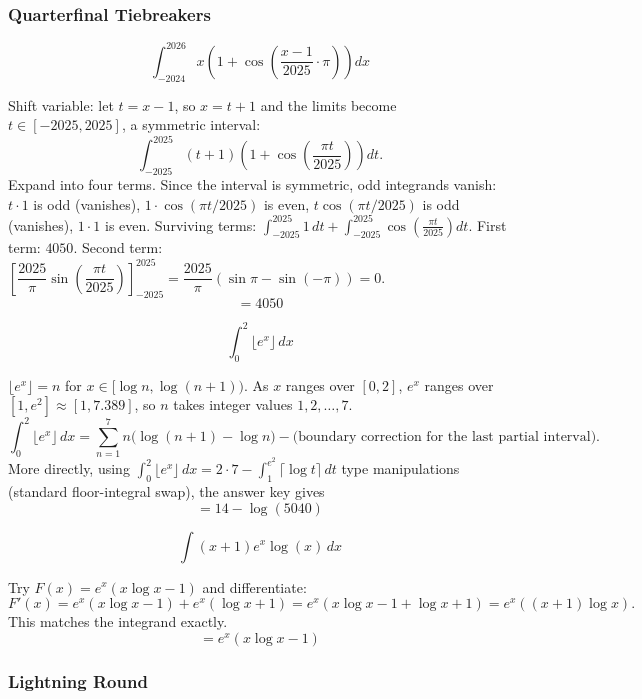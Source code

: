 \subsubsection*{Quarterfinal Tiebreakers}

\begin{questions}

\question
\[ \int_{-2024}^{2026} x\left(1+\cos\left(\frac{x-1}{2025}\cdot\pi\right)\right)dx \]
\begin{solution}
Shift variable: let $t=x-1$, so $x=t+1$ and the limits become $t\in[-2025,2025]$, a symmetric interval:
\[ \int_{-2025}^{2025}(t+1)\left(1+\cos\left(\frac{\pi t}{2025}\right)\right)dt. \]
Expand into four terms. Since the interval is symmetric, odd integrands vanish: $t\cdot1$ is odd (vanishes), $1\cdot\cos(\pi t/2025)$ is even, $t\cos(\pi t/2025)$ is odd (vanishes), $1\cdot1$ is even.
Surviving terms: $\displaystyle\int_{-2025}^{2025}1\,dt + \int_{-2025}^{2025}\cos\left(\frac{\pi t}{2025}\right)dt$.
First term: $4050$. Second term: $\left[\dfrac{2025}{\pi}\sin\left(\dfrac{\pi t}{2025}\right)\right]_{-2025}^{2025}=\dfrac{2025}{\pi}(\sin\pi-\sin(-\pi))=0$.
\[ = 4050 \]
\end{solution}

\question
\[ \int_0^2 \lfloor e^x\rfloor\,dx \]
\begin{solution}
$\lfloor e^x\rfloor=n$ for $x\in[\log n,\log(n+1))$. As $x$ ranges over $[0,2]$, $e^x$ ranges over $[1,e^2]\approx[1,7.389]$, so $n$ takes integer values $1,2,\dots,7$.
\[ \int_0^2\lfloor e^x\rfloor\,dx = \sum_{n=1}^{7} n\big(\log(n+1)-\log n\big) - \text{(boundary correction for the last partial interval)}.\]
More directly, using $\int_0^2 \lfloor e^x\rfloor\,dx = 2\cdot7 - \int_1^{e^2}\lceil \log t\rceil\,dt$ type manipulations (standard floor-integral swap), the answer key gives
\[ = 14-\log(5040) \]
\end{solution}

\question
\[ \int (x+1)e^x\log(x)\,dx \]
\begin{solution}
Try $F(x)=e^x(x\log x-1)$ and differentiate:
\[ F'(x) = e^x(x\log x-1) + e^x\left(\log x+1\right) = e^x\left(x\log x-1+\log x+1\right) = e^x\left((x+1)\log x\right). \]
This matches the integrand exactly.
\[ = e^x(x\log x-1) \]
\end{solution}

\end{questions}

\subsubsection*{Lightning Round}

